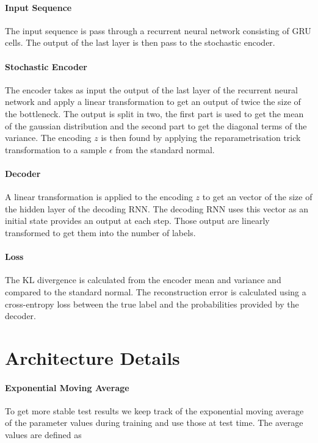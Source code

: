 \documentclass[10pt,oneside,openright]{report}
\begin{document}
\paragraph{Input Sequence}
The input sequence is pass through a recurrent neural network consisting of GRU cells. The output of the last layer is then pass to the stochastic encoder.

\paragraph{Stochastic Encoder}
The encoder takes as input the output of the last layer of the recurrent neural network and apply a linear transformation to get an output of twice the size of the bottleneck. The output is split in two, the first part is used to get the mean of the gaussian distribution and the second part to get the diagonal terms of the variance. The encoding $z$ is then found by applying the reparametrisation trick transformation to a sample $\epsilon$ from the standard normal.

\paragraph{Decoder}
A linear transformation is applied to the encoding $z$  to get an vector of the size of the hidden layer of the decoding RNN. The decoding RNN uses this vector as an initial state provides an output at each step. Those output are linearly transformed to get them into the number of labels. 

\paragraph{Loss}
The KL divergence is calculated from the encoder mean and variance and compared to the standard normal. The reconstruction error is calculated using a cross-entropy loss between the true label and the probabilities provided by the decoder.

\section{Architecture Details }
\paragraph{Exponential Moving Average}
To get more stable test results we keep track of the exponential moving average of the parameter values during training and use those at test time. The average values are defined as
\end{document}
